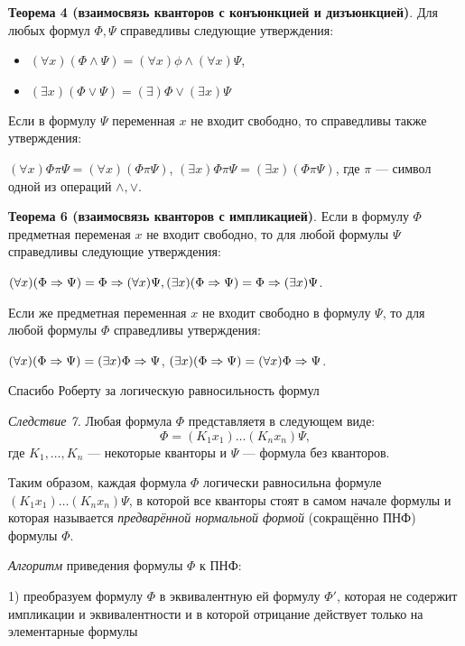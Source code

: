 \textbf{Теорема 4 (взаимосвязь кванторов с конъюнкцией и дизъюнкцией)}. Для любых формул $\Phi, \Psi$ справедливы следующие утверждения:
\begin{itemize}
    \item $(\forall x)(\Phi \land \Psi) = (\forall x)\phi \land (\forall x)\Psi$,
    \item $(\exists x)(\Phi \lor \Psi) = (\exists)\Phi \lor (\exists x)\Psi$
\end{itemize}

Если в формулу $\Psi$ переменная $x$ не входит свободно, то справедливы также утверждения:

$(\forall x)\Phi \pi \Psi = (\forall x)(\Phi \pi \Psi)$, $(\exists x)\Phi \pi \Psi = (\exists x)(\Phi \pi \Psi)$, где $\pi$ --- символ одной из операций $\land, \lor$.

\textbf{Теорема 6 (взаимосвязь кванторов с импликацией)}. Если в формулу $\Phi$ предметная переменая $x$ не входит свободно, то для любой формулы $\Psi$ справедливы следующие утверждения:

$(\forall x)(\Phi \Rightarrow \Psi) = \Phi \Rightarrow (\forall x)\Psi, (\exists x)(\Phi \Rightarrow \Psi) = \Phi \Rightarrow (\exists x)\Psi$.

Если же предметная переменная $x$ не входит свободно в формулу $\Psi$, то для любой формулы $\Phi$ справедливы утверждения:

$(\forall x)(\Phi \Rightarrow \Psi) = (\exists x)\Phi \Rightarrow \Psi$, $(\exists x)(\Phi \Rightarrow \Psi) = (\forall x)\Phi \Rightarrow \Psi$.

Спасибо Роберту за логическую равносильность формул


{\it Следствие 7.} Любая формула $\Phi$ представляетя в следующем виде:
\begin{equation*}
    \Phi = (K_1 x_1)\dots(K_n x_n)\Psi,
\end{equation*}
где $K_1,\dots,K_n$ --- некоторые кванторы и $\Psi$ --- формула без кванторов.

Таким образом, каждая формула $\Phi$ логически равносильна формуле $(K_1 x_1)\dots(K_n x_n)\Psi$, в которой все кванторы стоят в самом начале формулы и которая называется \textit{предварённой нормальной формой} (сокращённо ПНФ) формулы $\Phi$.


{\it Алгоритм} приведения формулы $\Phi$ к ПНФ:

1) преобразуем формулу $\Phi$ в эквивалентную ей формулу $\Phi'$, которая не содержит импликации и эквивалентности и в которой отрицание действует только на элементарные формулы

